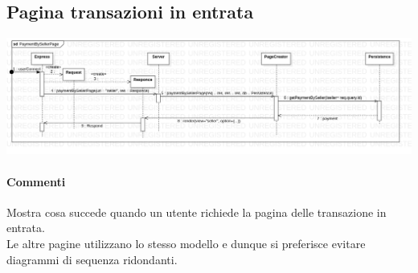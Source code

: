 \documentclass[a4paper, 12pt]{article}
\begin{document}
\subsection{Pagina transazioni in entrata}
\includegraphics[width=1.0\textwidth]{paymentBySellerPage}
\paragraph{Commenti}
Mostra cosa succede quando un utente richiede la pagina delle transazione in entrata.\\
Le altre pagine utilizzano lo stesso modello e dunque si preferisce evitare diagrammi di sequenza ridondanti.
\end{document}
